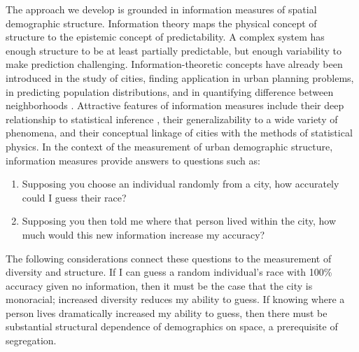 	The approach we develop is grounded in information measures of spatial demographic structure. Information theory maps the physical concept of structure to the epistemic concept of predictability. A complex system has enough structure to be at least partially predictable, but enough variability to make prediction challenging. Information-theoretic concepts have already been introduced in the study of cities, finding application in urban planning problems, in predicting population distributions, and in quantifying difference between neighborhoods \cite{Royal2014,Batty1974,Batty1976,Battya,Bettencourt2015,Webber1979}. Attractive features of information measures include their deep relationship to statistical inference \cite{Cover1991,Csiszzr2004}, their generalizability to a wide variety of phenomena, and their conceptual linkage of cities with the methods of statistical physics. In the context of the measurement of urban demographic structure, information measures provide answers to questions such as: 
	\begin{enumerate}
		\item Supposing you choose an individual randomly from a city, how accurately could I guess their race? 
		\item Supposing you then told me where that person lived within the city, how much would this new information increase my accuracy? 
	\end{enumerate}
	The following considerations connect these questions to the measurement of diversity and structure. If I can guess a random individual's race with 100\% accuracy given no information, then it must be the case that the city is monoracial; increased diversity reduces my ability to guess. If knowing where a person lives dramatically increased my ability to guess, then there must be substantial structural dependence of demographics on space, a prerequisite of segregation. 


